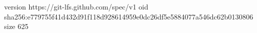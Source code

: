 version https://git-lfs.github.com/spec/v1
oid sha256:e779755f41d432d91f118d928614959e0dc26df5e5884077a546dc62b0130806
size 625
